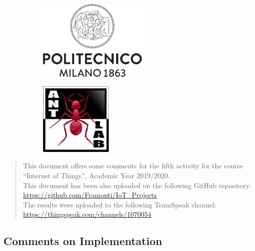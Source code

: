 \documentclass[12pt]{article}
\begin{document}
\begin{titlepage}

\begin{figure}[h]
	\begin{subfigure}{0.5\textwidth}
		\includegraphics[width=150pt, left]{Logo_Politecnico_Milano.png}
	\end{subfigure} 
	\begin{subfigure}{0.5\textwidth}
		\includegraphics[width=100pt, right]{Ant_Lab_Logo.png}
	\end{subfigure}
\end{figure} 
 

\vfill

\end{titlepage}
\begin{abstract}
This document offers some comments for the fifth activity for the course ``Internet of Things'', Academic Year 2019/2020. \\
This document has been also uploaded on the following GitHub repository: \url{https://github.com/Framonti/IoT_Projects}\\
The results were uploaded to the following TeamSpeak channel: \url{https://thingspeak.com/channels/1070054}
\end{abstract}
\subsection{Comments on Implementation}
\end{document}
